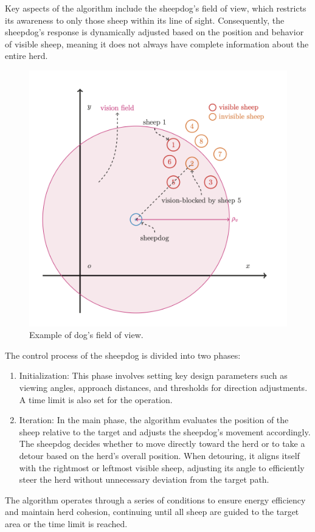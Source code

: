 \documentclass[9pt]{pnas-new}
\begin{document}
Key aspects of the algorithm include the sheepdog's field of view, which restricts its awareness to only those sheep within its line of sight. Consequently, the sheepdog's response is dynamically adjusted based on the position and behavior of visible sheep, meaning it does not always have complete information about the entire herd.

\begin{figure}[H]
	\centering
	\includegraphics[width=.6\linewidth]{fig/vision-field.png}
	\caption{Example of dog's field of view.\cite{liu2021}}
	\label{fig:vision-field}
\end{figure}

The control process of the sheepdog is divided into two phases:
\begin{enumerate}
    \item Initialization: This phase involves setting key design parameters such as viewing angles, approach distances, and thresholds for direction adjustments. A time limit is also set for the operation.
    \item Iteration: In the main phase, the algorithm evaluates the position of the sheep relative to the target and adjusts the sheepdog's movement accordingly. The sheepdog decides whether to move directly toward the herd or to take a detour based on the herd's overall position. When detouring, it aligns itself with the rightmost or leftmost visible sheep, adjusting its angle to efficiently steer the herd without unnecessary deviation from the target path.
\end{enumerate}

The algorithm operates through a series of conditions to ensure energy efficiency and maintain herd cohesion, continuing until all sheep are guided to the target area or the time limit is reached.
\end{document}
